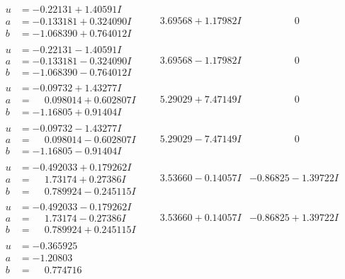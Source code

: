\documentclass[1p]{elsarticle_modified}
\theoremstyle{definition}
\begin{document}
$$\begin{array}{c|c|c}
\begin{aligned}
u &= -0.22131 + 1.40591 I \\
a &= -0.133181 + 0.324090 I \\
b &= -1.068390 + 0.764012 I\end{aligned}
 & \phantom{-}3.69568 + 1.17982 I & \phantom{-0.000000 } 0 \\ \hline\begin{aligned}
u &= -0.22131 - 1.40591 I \\
a &= -0.133181 - 0.324090 I \\
b &= -1.068390 - 0.764012 I\end{aligned}
 & \phantom{-}3.69568 - 1.17982 I & \phantom{-0.000000 } 0 \\ \hline\begin{aligned}
u &= -0.09732 + 1.43277 I \\
a &= \phantom{-}0.098014 + 0.602807 I \\
b &= -1.16805 + 0.91404 I\end{aligned}
 & \phantom{-}5.29029 + 7.47149 I & \phantom{-0.000000 } 0 \\ \hline\begin{aligned}
u &= -0.09732 - 1.43277 I \\
a &= \phantom{-}0.098014 - 0.602807 I \\
b &= -1.16805 - 0.91404 I\end{aligned}
 & \phantom{-}5.29029 - 7.47149 I & \phantom{-0.000000 } 0 \\ \hline\begin{aligned}
u &= -0.492033 + 0.179262 I \\
a &= \phantom{-}1.73174 + 0.27386 I \\
b &= \phantom{-}0.789924 - 0.245115 I\end{aligned}
 & \phantom{-}3.53660 - 0.14057 I & -0.86825 - 1.39722 I \\ \hline\begin{aligned}
u &= -0.492033 - 0.179262 I \\
a &= \phantom{-}1.73174 - 0.27386 I \\
b &= \phantom{-}0.789924 + 0.245115 I\end{aligned}
 & \phantom{-}3.53660 + 0.14057 I & -0.86825 + 1.39722 I \\ \hline\begin{aligned}
u &= -0.365925\phantom{ +0.000000I} \\
a &= -1.20803\phantom{ +0.000000I} \\
b &= \phantom{-}0.774716\phantom{ +0.000000I}\end{aligned}

\end{array}$$
\end{document}
